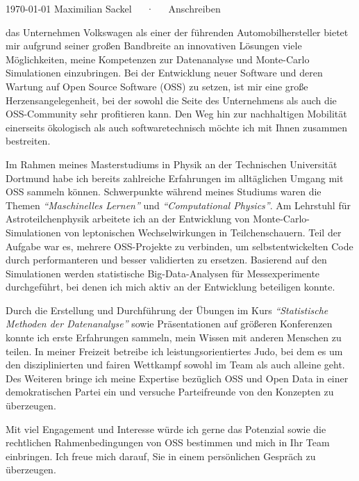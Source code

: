 \documentclass[11pt, a4paper]{Awesome-CV/awesome-cv}
\begin{document}
\makecvheader[R]

\makecvfooter
{\today}
{Maximilian Sackel~~~·~~~Anschreiben}
{}

\makelettertitle

\begin{cvletter}
    das Unternehmen Volkswagen als einer der führenden Automobilhersteller bietet mir aufgrund seiner großen Bandbreite an innovativen Lösungen viele Möglichkeiten, meine Kompetenzen zur Datenanalyse und Monte-Carlo Simulationen einzubringen.
    Bei der Entwicklung neuer Software und deren Wartung auf Open Source Software (OSS) zu setzen, ist mir eine große Herzensangelegenheit, bei der sowohl die Seite des Unternehmens als auch die OSS-Community sehr profitieren kann.
    Den Weg hin zur nachhaltigen Mobilität einerseits ökologisch als auch softwaretechnisch möchte ich mit Ihnen zusammen bestreiten.


    Im Rahmen meines Masterstudiums in Physik an der Technischen Universität Dortmund habe ich bereits zahlreiche Erfahrungen im alltäglichen Umgang mit OSS sammeln können.
    Schwerpunkte während meines Studiums waren die Themen \textit{``Maschinelles Lernen''} und \textit{``Computational Physics''}.
    Am Lehrstuhl für Astroteilchenphysik arbeitete ich an der Entwicklung von Monte-Carlo-Simulationen von leptonischen Wechselwirkungen in Teilchenschauern.
    Teil der Aufgabe war es, mehrere OSS-Projekte zu verbinden, um selbstentwickelten Code durch performanteren und besser validierten zu ersetzen.
    Basierend auf den Simulationen werden statistische Big-Data-Analysen für Messexperimente durchgeführt, bei denen ich mich aktiv an der Entwicklung beteiligen konnte.

    Durch die Erstellung und Durchführung der Übungen im Kurs \textit{``Statistische Methoden der Datenanalyse''} sowie Präsentationen auf größeren Konferenzen konnte ich erste Erfahrungen sammeln, mein Wissen mit anderen Menschen zu teilen.
    In meiner Freizeit betreibe ich leistungsorientiertes Judo, bei dem es um den disziplinierten und fairen Wettkampf sowohl im Team als auch alleine geht.
    Des Weiteren bringe ich meine Expertise bezüglich OSS und Open Data in einer demokratischen Partei ein und versuche Parteifreunde von den Konzepten zu überzeugen.

Mit viel Engagement und Interesse würde ich gerne das Potenzial sowie die rechtlichen Rahmenbedingungen von OSS bestimmen und mich in Ihr Team einbringen.
Ich freue mich darauf, Sie in einem persönlichen Gespräch zu überzeugen.

\end{cvletter}


\makeletterclosing
\end{document}
